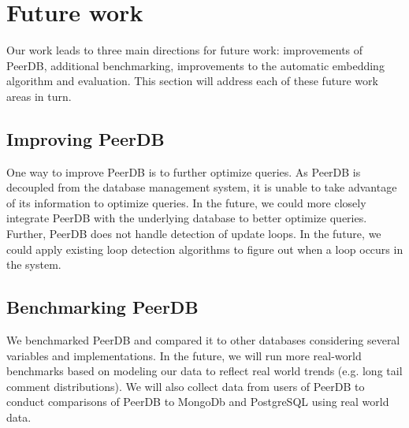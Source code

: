\section{Future work}
Our work leads to three main directions for future work: improvements of PeerDB, additional benchmarking, improvements to the automatic embedding algorithm and evaluation.
This section will address each of these future work areas in turn.

\subsection{Improving PeerDB}
One way to improve PeerDB is to further optimize queries. 
As PeerDB is decoupled from the database management system, it is unable to take advantage of its information to optimize queries. 
In the future, we could more closely integrate PeerDB with the underlying database to better optimize queries. 
Further, PeerDB does not handle detection of update loops. 
In the future, we could apply existing loop detection algorithms to figure out when a loop occurs in the system.

\subsection{Benchmarking PeerDB}
We benchmarked PeerDB and compared it to other databases considering several variables and implementations. In the future, we will run more real-world benchmarks based on modeling our data to reflect real world trends (e.g. long tail comment distributions). 
We will also collect data from users of PeerDB to conduct comparisons of PeerDB to MongoDb and PostgreSQL using real world data.

